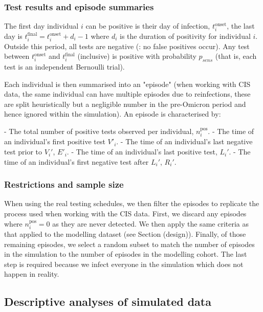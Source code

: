 \documentclass[thesis.tex]{subfiles}
\begin{document}
\subsubsection{Test results and episode summaries}

The first day individual $i$ can be positive is their day of infection, $t_i^\text{onset}$, the last day is $t_i^\text{final} = t_i^\text{onset} + d_i - 1$ where $d_i$ is the duration of positivity for individual $i$.
Outside this period, all tests are negative (\ie: no false positives occur). 
Any test between $t_i^\text{onset}$ and $t_i^\text{final}$ (inclusive) is positive with probability $p_{sens}$ (that is, each test is an independent Bernoulli trial).

Each individual is then summarised into an "episode" (when working with CIS data, the same individual can have multiple episodes due to reinfections, these are split heuristically but a negligible number in the pre-Omicron period and hence ignored within the simulation).
An episode is characterised by:

- The total number of positive tests observed per individual, $n_i^\text{pos}$.
- The time of an individual's first positive test $V'_i$.
- The time of an individual's last negative test prior to $V_i'$, $E'_i$.
- The time of an individual's last positive test, $L_i'$.
- The time of an individual's first negative test after $L_i'$, $R_i'$.

\subsubsection{Restrictions and sample size}

When using the real testing schedules, we then filter the episodes to replicate the process used when working with the CIS data.
First, we discard any episodes where $n_i^\text{pos}=0$ as they are never detected.
We then apply the same criteria as that applied to the modelling dataset (see Section \@ref(design)).
Finally, of those remaining episodes, we select a random subset to match the number of episodes in the simulation to the number of episodes in the modelling cohort.
The last step is required because we infect everyone in the simulation which does not happen in reality.

\subsection{Descriptive analyses of simulated data}
\end{document}
